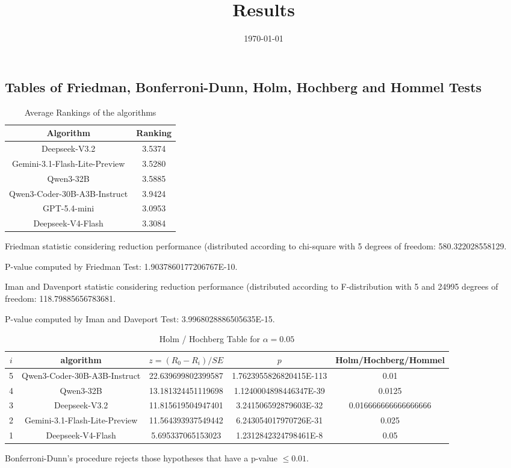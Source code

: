 \documentclass[a4paper,10pt]{article}
\title{Results}
\date{\today}
\begin{document}
\begin{landscape}
\oddsidemargin 0in \topmargin 0in\maketitle
\section{Tables of Friedman, Bonferroni-Dunn, Holm, Hochberg and Hommel Tests}
\begin{table}[!htp]
\centering
\caption{Average Rankings of the algorithms
}\begin{tabular}{c|c}
Algorithm&Ranking\\
\hline
Deepseek-V3.2&3.5374\\
Gemini-3.1-Flash-Lite-Preview&3.5280\\
Qwen3-32B&3.5885\\
Qwen3-Coder-30B-A3B-Instruct&3.9424\\
GPT-5.4-mini&3.0953\\
Deepseek-V4-Flash&3.3084\\
\end{tabular}
\end{table}


Friedman statistic considering reduction performance (distributed according to chi-square with 5 degrees of freedom: 580.322028558129.


P-value computed by Friedman Test: 1.9037860177206767E-10.\newline

Iman and Davenport statistic considering reduction performance (distributed according to F-distribution with 5 and 24995 degrees of freedom: 118.79885656783681.


P-value computed by Iman and Daveport Test: 3.9968028886505635E-15.\newline

\begin{table}[!htp]
\centering\tiny
\caption{Holm / Hochberg Table for $\alpha=0.05$}
\begin{tabular}{ccccc}
$i$&algorithm&$z=(R_0 - R_i)/SE$&$p$&Holm/Hochberg/Hommel\\
\hline
5&Qwen3-Coder-30B-A3B-Instruct&22.639699802399587&1.7623955826820415E-113&0.01\\
4&Qwen3-32B&13.181324451119698&1.1240004898446347E-39&0.0125\\
3&Deepseek-V3.2&11.815619504947401&3.241506592879603E-32&0.016666666666666666\\
2&Gemini-3.1-Flash-Lite-Preview&11.564393937549442&6.243054017970726E-31&0.025\\
1&Deepseek-V4-Flash&5.695337065153023&1.2312842324798461E-8&0.05\\
\hline
\end{tabular}
\end{table}
Bonferroni-Dunn's procedure rejects those hypotheses that have a p-value $\le0.01$.



\end{landscape}
\end{document}
